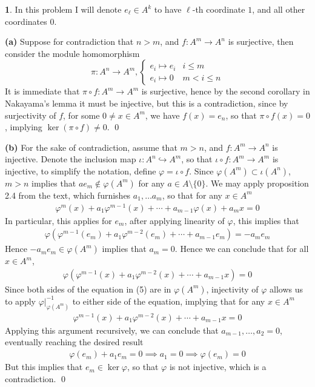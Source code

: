 \documentclass[11pt]{article}
\theoremstyle{definition}
\newtheorem{pb}{}
\newcommand{\set}[1]{\{#1\}}
\begin{document}
    \begin{pb}
        In this problem I will denote \(e_\ell \in A^k\) to have \(\ell\)-th coordinate \(1\), and all other coordinates \(0\).

        \textbf{(a)} Suppose for contradiction that \(n > m\), and \(f: A^m \to A^n\) is surjective, then consider the module homomorphism \[\pi: A^n \to A^m, \begin{cases}
            e_i \mapsto e_i & i \leq m \\
            e_i \mapsto 0 & m < i \leq n
        \end{cases}\]
        It is immediate that \(\pi \circ f: A^m \to A^m\) is surjective, hence by the second corollary in Nakayama's lemma it must be injective, but this is a contradiction, since by surjectivity of \(f\), for some \(0 \neq x \in A^m\), we have \(f(x) = e_n\), so that \(\pi \circ f (x) = 0\), implying \(\ker (\pi \circ f) \neq 0\). \qed

        \textbf{(b)} For the sake of contradiction, assume that \(m > n\), and \(f:A^m \to A^n\) is injective. Denote the inclusion map \(\iota : A^n \hookrightarrow A^m\), so that \(\iota \circ f: A^m \to A^m\) is injective, to simplify the notation, define \(\varphi = \iota \circ f\). Since \(\varphi(A^m) \subset \iota(A^n)\), \(m > n\) implies that \(a e_m \not \in \varphi(A^m)\) for any \(a \in A \setminus \set{0}\). We may apply proposition 2.4 from the text, which furnishes \(a_1, \hdots a_m\), so that for any \(x \in A^m\)
        \begin{align*}
            \varphi^m(x) + a_1 \varphi^{m-1}(x) + \cdots + a_{m-1}\varphi(x) + a_m x = 0
        \end{align*}
        In particular, this applies for \(e_m\), after applying linearity of \(\varphi\), this implies that
        \begin{align*}
            \varphi(\varphi^{m-1}(e_m) + a_1 \varphi^{m-2}(e_m) + \cdots + a_{m-1}e_m) = -a_m e_m
        \end{align*}
        Hence \(-a_m e_m \in \varphi(A^m)\) implies that \(a_m = 0\). Hence we can conclude that for all \(x \in A^m\),
        \begin{align}
            \varphi(\varphi^{m-1}(x) + a_1 \varphi^{m-2}(x) + \cdots + a_{m-1}x) = 0
        \end{align}
        Since both sides of the equation in (5) are in \(\varphi(A^m)\), injectivity of \(\varphi\) allows us to apply \(\varphi\vert_{\varphi(A^m)}^{-1}\) to either side of the equation, implying that for any \(x \in A^m\)
        \begin{align*}
            \varphi^{m-1}(x) + a_1 \varphi^{m-2}(x) + \cdots + a_{m-1}x = 0
        \end{align*}
        Applying this argument recursively, we can conclude that \(a_{m-1}, \hdots, a_2 = 0\), eventually reaching the desired result
        \begin{align*}
            \varphi(e_m) + a_1e_m = 0 \implies a_1 = 0 \implies \varphi(e_m) = 0
        \end{align*}
        But this implies that \(e_m \in \ker \varphi\), so that \(\varphi\) is not injective, which is a contradiction. \qed
    \end{pb}
\end{document}
